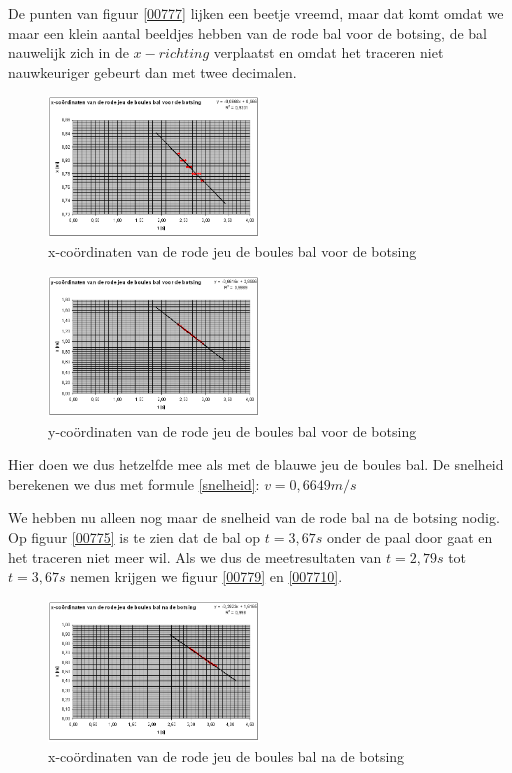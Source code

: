 \documentclass[12pt,a4paper]{article}
\begin{document}
	De punten van figuur \eqref{00777} lijken een beetje vreemd, maar dat komt omdat we maar een klein aantal beeldjes hebben van de rode bal voor de botsing, de bal nauwelijk zich in de $x-richting$ verplaatst en omdat het traceren niet nauwkeuriger gebeurt dan met twee decimalen.
	
	\begin{figure}[H]
		\centerline{\includegraphics[width=0.5\textwidth]{Plaatjes/00777.png}}
		\caption{x-co\"{o}rdinaten van de rode jeu de boules bal voor de botsing}
		\label{00777}
	\end{figure}
	
	\begin{figure}[H]
		\centerline{\includegraphics[width=0.5\textwidth]{Plaatjes/00778.png}}
		\caption{y-co\"{o}rdinaten van de rode jeu de boules bal voor de botsing}
		\label{00778}
	\end{figure}

	Hier doen we dus hetzelfde mee als met de blauwe jeu de boules bal. De snelheid berekenen we dus met formule \eqref{snelheid}: $v=0,6649m/s$

	We hebben nu alleen nog maar de snelheid van de rode bal na de botsing nodig. Op figuur \eqref{00775} is te zien dat de bal op $t=3,67s$ onder de paal door gaat en het traceren niet meer wil. Als we dus de meetresultaten van $t=2,79s$ tot $t=3,67s$ nemen krijgen we figuur \eqref{00779} en \eqref{007710}.

	\begin{figure}[H]
		\centerline{\includegraphics[width=0.5\textwidth]{Plaatjes/00779.png}}
		\caption{x-co\"{o}rdinaten van de rode jeu de boules bal na de botsing}
		\label{00779}
	\end{figure}
	
\end{document}
